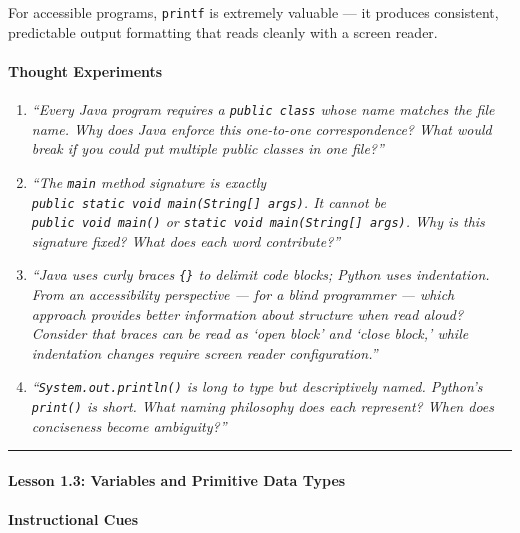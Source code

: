\documentclass[
  justified,
  openright,
]{tufte-book}
\let\subsubsection\paragraph
\let\paragraph\paragraph
\let\subsubsection\paragraph
\let\paragraph\paragraph
\begin{document}
For accessible programs, \texttt{printf} is extremely valuable --- it
produces consistent, predictable output formatting that reads cleanly
with a screen reader.

\paragraph{Thought Experiments}\label{thought-experiments-1}

\begin{enumerate}
\def\labelenumi{\arabic{enumi}.}
\item
  \emph{``Every Java program requires a \texttt{public\ class} whose
  name matches the file name. Why does Java enforce this one-to-one
  correspondence? What would break if you could put multiple public
  classes in one file?''}
\item
  \emph{``The \texttt{main} method signature is exactly
  \texttt{public\ static\ void\ main(String{[}{]}\ args)}. It cannot be
  \texttt{public\ void\ main()} or
  \texttt{static\ void\ main(String{[}{]}\ args)}. Why is this signature
  fixed? What does each word contribute?''}
\item
  \emph{``Java uses curly braces \texttt{\{\}} to delimit code blocks;
  Python uses indentation. From an accessibility perspective --- for a
  blind programmer --- which approach provides better information about
  structure when read aloud? Consider that braces can be read as `open
  block' and `close block,' while indentation changes require screen
  reader configuration.''}
\item
  \emph{``\texttt{System.out.println()} is long to type but
  descriptively named. Python's \texttt{print()} is short. What naming
  philosophy does each represent? When does conciseness become
  ambiguity?''}
\end{enumerate}

\begin{center}\rule{0.5\linewidth}{0.5pt}\end{center}

\subsubsection{Lesson 1.3: Variables and Primitive Data
Types}\label{lesson-1.3-variables-and-primitive-data-types}

\paragraph{Instructional Cues}\label{instructional-cues-2}
\end{document}
